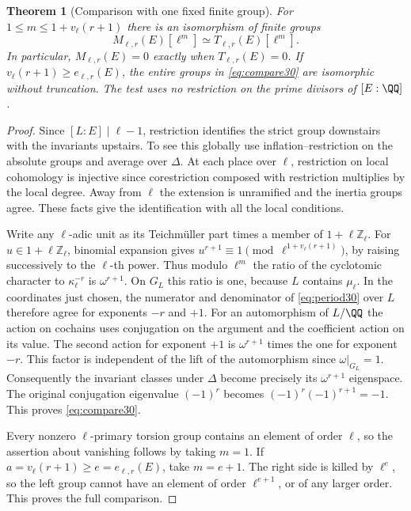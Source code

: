\documentclass[a4paper,11pt]{article}
\newtheorem{theorem}[proposition]{Theorem}
\theoremstyle{definition}
\theoremstyle{remark}
\newcommand{\ZZ}{\mathbb Z}\newcommand{\ord}{\operatorname{ord}}
\numberwithin{equation}{section}
\begin{document}
\begin{theorem}[Comparison with one fixed finite group]\label{thm:compare30}
For \(1\le m\le1+v_\ell(r+1)\) there is an isomorphism of finite groups
\begin{equation}
            M_{\ell,r}(E)[\ell^m]\simeq
            T_{\ell,r}(E)[\ell^m].                             \label{eq:compare30}
\end{equation}
In particular, \(M_{\ell,r}(E)=0\) exactly when \(T_{\ell,r}(E)=0\). If \(v_\ell(r+1)\ge e_{\ell,r}(E)\), the entire groups in \eqref{eq:compare30} are isomorphic without truncation. The test uses no restriction on the prime divisors of \([E:\QQ]\).
\end{theorem}
\begin{proof}
Since \([L:E]\mid\ell-1\), restriction identifies the strict group downstairs with the invariants upstairs. To see this globally use inflation--restriction on the absolute groups and average over \(\Delta\). At each place over \(\ell\), restriction on local cohomology is injective since corestriction composed with restriction multiplies by the local degree. Away from \(\ell\) the extension is unramified and the inertia groups agree. These facts give the identification with all the local conditions.

Write any \(\ell\)-adic unit as its Teichm\"uller part times a member of \(1+\ell\ZZ_\ell\). For \(u\in1+\ell\ZZ_\ell\), binomial expansion gives \(u^{r+1}\equiv1\pmod {\ell^{1+v_\ell(r+1)}}\), by raising successively to the \(\ell\)-th power. Thus modulo \(\ell^m\) the ratio of the cyclotomic character to \(\kappa_\ell^{-r}\) is \(\omega^{r+1}\). On \(G_L\) this ratio is one, because \(L\) contains \(\mu_\ell\). In the coordinates just chosen, the numerator and denominator of \eqref{eq:period30} over \(L\) therefore agree for exponents \(-r\) and \(+1\). For an automorphism of \(L/\QQ\) the action on cochains uses conjugation on the argument and the coefficient action on its value. The second action for exponent \(+1\) is \(\omega^{r+1}\) times the one for exponent \(-r\). This factor is independent of the lift of the automorphism since \(\omega|_{G_L}=1\). Consequently the invariant classes under \(\Delta\) become precisely its \(\omega^{r+1}\) eigenspace. The original conjugation eigenvalue \((-1)^r\) becomes \((-1)^r(-1)^{r+1}=-1\). This proves \eqref{eq:compare30}.

Every nonzero \(\ell\)-primary torsion group contains an element of order \(\ell\), so the assertion about vanishing follows by taking \(m=1\). If \(a=v_\ell(r+1)\ge e=e_{\ell,r}(E)\), take \(m=e+1\). The right side is killed by \(\ell^e\), so the left group cannot have an element of order \(\ell^{e+1}\), or of any larger order. This proves the full comparison.
\end{proof}
\end{document}
